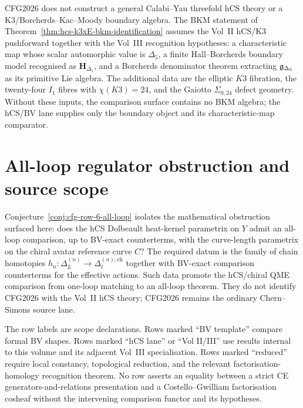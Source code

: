 \begin{remark}
\label{rem:cfg-imperfect-row-14}
CFG2026 does not construct a general Calabi--Yau threefold hCS theory
or a K3/Borcherds--Kac--Moody boundary algebra. The BKM statement of
Theorem~\ref{thm:hcs-k3xE-bkm-identification} assumes the Vol~II
hCS/K3 pushforward together with the Vol~III recognition hypotheses:
a characteristic map whose scalar automorphic value is $\Delta_5$, a
finite Hall--Borcherds boundary model recognised as
$\mathbf H_{\Delta_5}$, and a Borcherds denominator theorem extracting
$\mathfrak{g}_{\Delta_5}$ as its primitive Lie algebra.
The additional data are the elliptic $K3$ fibration, the
twenty-four $I_1$ fibres with $\chi(K3)=24$, and the Gaiotto
$\Sigma_{0,24}$ defect geometry. Without these inputs, the comparison
surface contains no BKM algebra; the hCS/BV lane supplies only the
boundary object and its characteristic-map comparator.
\end{remark}

\section{All-loop regulator obstruction and source scope}
\label{sec:cfg-regulator-obstruction}

\begin{remark}
\label{rem:cfg-regulator-obstruction}
Conjecture~\ref{conj:cfg-row-6-all-loop} isolates the mathematical
obstruction surfaced here: does the hCS Dolbeault heat-kernel parametrix
on $Y$ admit an all-loop comparison, up to BV-exact counterterms, with
the curve-length parametrix on the chiral avatar reference curve $C$?
The required datum is the family of chain homotopies
$h_n\colon\Delta_L^{(n)}\to\Delta_\ell^{(n),\mathrm{ch}}$ together
with BV-exact comparison counterterms for the effective actions. Such
data promote the hCS/chiral QME comparison from one-loop matching to an
all-loop theorem. They do not identify CFG2026 with the Vol~II hCS
theory; CFG2026 remains the ordinary Chern--Simons source lane.
\end{remark}

\begin{remark}
\label{rem:cfg-source-scope}
The row labels are scope declarations. Rows marked ``BV template''
compare formal BV shapes. Rows marked ``hCS lane'' or ``Vol II/III''
use results internal to this volume and its adjacent Vol~III
specialisation. Rows marked ``reduced'' require local constancy,
topological reduction, and the relevant factorisation-homology
recognition theorem. No row asserts an equality between a strict CE
generators-and-relations presentation and a Costello--Gwilliam
factorisation cosheaf without the intervening comparison functor and
its hypotheses.
\end{remark}

